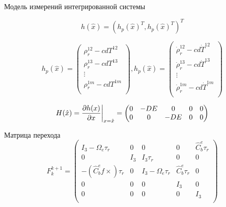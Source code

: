 \documentclass[aspectratio=43,display]{beamer}
\begin{document}
\begin{frame}{Модель измерений интегрированной системы}
	
	\begin{equation}
		\label{eq:ins_19}
		h(\hat{x}) = (h_p(\hat{x})^T, h_{\dot{p}}(\hat{x})^T)^T
	\end{equation}

\vspace{0.5cm}

	\begin{equation*}
		h_p(\hat{x}) = 
		\begin{pmatrix}
			\rho_r^{12} - cdT^{12} \\
			\rho_r^{13} - cdT^{13} \\
			\vdots \\ 
			\rho_r^{1m} - cdT^{1m} \\
		\end{pmatrix}
		,
		h_{\dot{p}}(\hat{x}) = 
		\begin{pmatrix}
			\dot{\rho}_r^{12} - cd\dot{T}^{12} \\
			\dot{\rho}_r^{13} - cd\dot{T}^{13} \\
			\vdots \\ 
			\dot{\rho}_r^{1m} - cd\dot{T}^{1m} \\
		\end{pmatrix}
	\end{equation*}

\vspace{0.5cm}

	\begin{equation}
		\label{eq:ins_20}
		H(\hat{x}) = \frac{\partial h(x)}{\partial x}\bigg{|}_{x=\hat{x}} = 
		\begin{pmatrix}
			0 & -DE & 0 & 0 & 0 \\ 
			0 & 0 & -DE & 0 & 0
		\end{pmatrix}
	\end{equation}

\end{frame}

\begin{frame}{Матрица перехода}
	\begin{equation}
		\label{eq:ins_21}
		F_k^{k+1} = 
		\begin{pmatrix}
			I_3 - \Omega_e \tau_r & 0 & 0 & 0 & \hat{C}_b^e \tau_r\\
			0 & I_3 & I_3 \tau_r & 0 & 0 \\
			-(\hat{C}_b^e f \times) \tau_r & 0 & I_3 - \Omega_e \tau_r & \hat{C}_b^e \tau_r & 0\\
			0 & 0 & 0 & I_3 & 0 \\
			0 & 0 & 0 & 0 & I_3 \\
		\end{pmatrix}
	\end{equation}
\end{frame}
\end{document}
